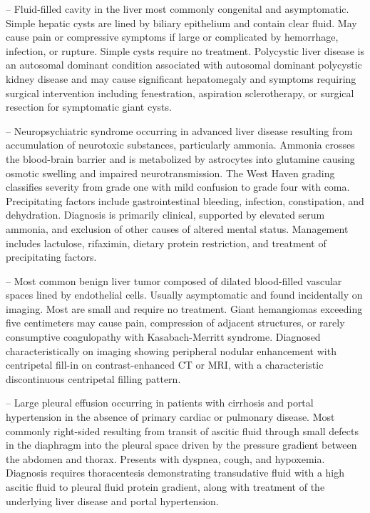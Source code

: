 -- Fluid-filled cavity in the liver most commonly congenital and asymptomatic. Simple hepatic cysts are lined by biliary epithelium and contain clear fluid. May cause pain or compressive symptoms if large or complicated by hemorrhage, infection, or rupture. Simple cysts require no treatment. Polycystic liver disease is an autosomal dominant condition associated with autosomal dominant polycystic kidney disease and may cause significant hepatomegaly and symptoms requiring surgical intervention including fenestration, aspiration sclerotherapy, or surgical resection for symptomatic giant cysts.

-- Neuropsychiatric syndrome occurring in advanced liver disease resulting from accumulation of neurotoxic substances, particularly ammonia. Ammonia crosses the blood-brain barrier and is metabolized by astrocytes into glutamine causing osmotic swelling and impaired neurotransmission. The West Haven grading classifies severity from grade one with mild confusion to grade four with coma. Precipitating factors include gastrointestinal bleeding, infection, constipation, and dehydration. Diagnosis is primarily clinical, supported by elevated serum ammonia, and exclusion of other causes of altered mental status. Management includes lactulose, rifaximin, dietary protein restriction, and treatment of precipitating factors.

-- Most common benign liver tumor composed of dilated blood-filled vascular spaces lined by endothelial cells. Usually asymptomatic and found incidentally on imaging. Most are small and require no treatment. Giant hemangiomas exceeding five centimeters may cause pain, compression of adjacent structures, or rarely consumptive coagulopathy with Kasabach-Merritt syndrome. Diagnosed characteristically on imaging showing peripheral nodular enhancement with centripetal fill-in on contrast-enhanced CT or MRI, with a characteristic discontinuous centripetal filling pattern.

-- Large pleural effusion occurring in patients with cirrhosis and portal hypertension in the absence of primary cardiac or pulmonary disease. Most commonly right-sided resulting from transit of ascitic fluid through small defects in the diaphragm into the pleural space driven by the pressure gradient between the abdomen and thorax. Presents with dyspnea, cough, and hypoxemia. Diagnosis requires thoracentesis demonstrating transudative fluid with a high ascitic fluid to pleural fluid protein gradient, along with treatment of the underlying liver disease and portal hypertension.

